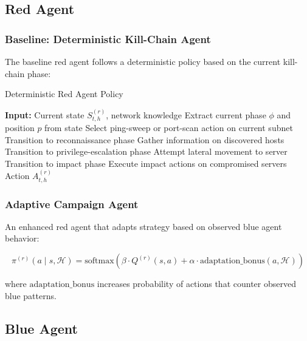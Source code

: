 \documentclass[11pt]{article}
\newcounter{phase}[algorithm]
\theoremstyle{definition}
\theoremstyle{plain}
\begin{document}
\subsection{Red Agent}

\subsubsection{Baseline: Deterministic Kill-Chain Agent}
The baseline red agent follows a deterministic policy based on the current kill-chain phase:

\begin{algorithm}
\caption{Deterministic Red Agent Policy}
\begin{algorithmic}[1]
\STATE \textbf{Input:} Current state $S_{t,h}^{(r)}$, network knowledge
\STATE Extract current phase $\phi$ and position $p$ from state
    \STATE Select ping-sweep or port-scan action on current subnet
        \STATE Transition to reconnaissance phase
    \ENDIF
{}
    \STATE Gather information on discovered hosts
        \STATE Transition to privilege-escalation phase
    \ENDIF
{}
    \STATE Attempt lateral movement to server
        \STATE Transition to impact phase
    \ENDIF
{}
    \STATE Execute impact actions on compromised servers
\ENDIF
\RETURN Action $A_{t,h}^{(r)}$
\end{algorithmic}
\end{algorithm}

\subsubsection{Adaptive Campaign Agent}
An enhanced red agent that adapts strategy based on observed blue agent behavior:

\begin{equation}
\pi^{(r)}(a \mid s, \mathcal{H}) = \text{softmax}(\beta \cdot Q^{(r)}(s, a) + \alpha \cdot \text{adaptation\_bonus}(a, \mathcal{H}))
\end{equation}

where $\text{adaptation\_bonus}$ increases probability of actions that counter observed blue patterns.

\subsection{Blue Agent}
\end{document}

